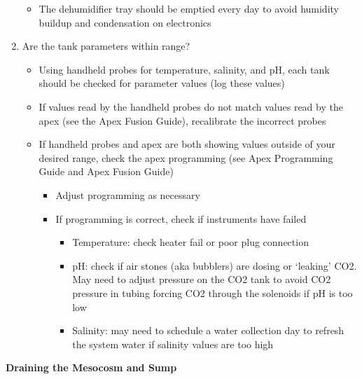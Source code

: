 \documentclass[
]{book}
\providecommand{\tightlist}{%
  \setlength{\itemsep}{0pt}\setlength{\parskip}{0pt}}
\begin{document}
\begin{enumerate}
  \begin{itemize}
  \tightlist
  \item
    The dehumidifier tray should be emptied every day to avoid humidity buildup and condensation on electronics
  \end{itemize}
\item
  Are the tank parameters within range?

  \begin{itemize}
  \tightlist
  \item
    Using handheld probes for temperature, salinity, and pH, each tank should be checked for parameter values (log these values)
  \item
    If values read by the handheld probes do not match values read by the apex (see the Apex Fusion Guide), recalibrate the incorrect probes
  \item
    If handheld probes and apex are both showing values outside of your desired range, check the apex programming (see Apex Programming Guide and Apex Fusion Guide)

    \begin{itemize}
    \tightlist
    \item
      Adjust programming as necessary
    \item
      If programming is correct, check if instruments have failed

      \begin{itemize}
      \tightlist
      \item
        Temperature: check heater fail or poor plug connection
      \item
        pH: check if air stones (aka bubblers) are dosing or `leaking' CO2. May need to adjust pressure on the CO2 tank to avoid CO2 pressure in tubing forcing CO2 through the solenoids if pH is too low
      \item
        Salinity: may need to schedule a water collection day to refresh the system water if salinity values are too high
      \end{itemize}
    \end{itemize}
  \end{itemize}
\end{enumerate}

\textbf{Draining the Mesocosm and Sump}
\end{document}
